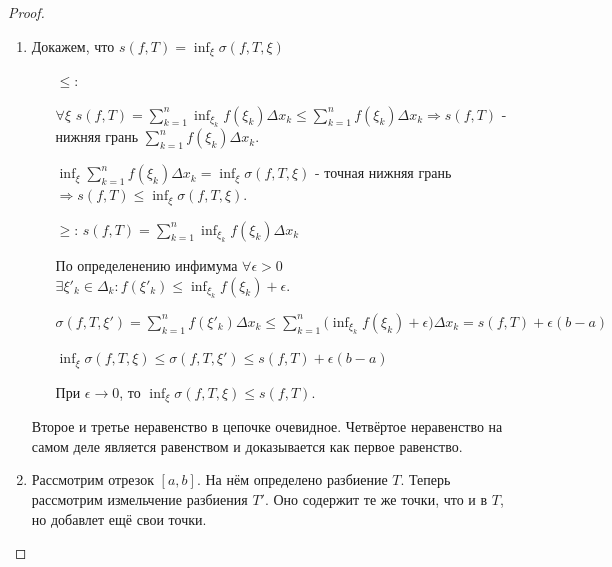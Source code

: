     \begin{proof}
    	\begin{enumerate}
    		\item Докажем, что $\displaystyle s(f, T) = \inf_{\xi}{\sigma(f, T, \xi)}$
    		\begin{enumerate}
    			\item[$\leqslant$:] 
    			
    			$\forall \xi$ $\displaystyle s(f, T) = \sum_{k = 1}^n \inf_{\xi_k}{f(\xi_k) \Delta x_k} \leqslant \sum_{k = 1}^n f(\xi_k) \Delta x_k \Rightarrow s(f, T)$ - нижняя грань $\displaystyle \sum_{k = 1}^n f(\xi_k) \Delta x_k$.
    			
    			$\displaystyle \inf_{\xi}{\sum_{k = 1}^n f(\xi_k) \Delta x_k} = \inf_{\xi}{\sigma(f, T, \xi)}$ - точная нижняя грань $\Rightarrow \displaystyle s(f, T) \leqslant \inf_{\xi}{\sigma(f, T, \xi)}$.
    			
    			\item[$\geqslant$:] $\displaystyle s(f, T) = \sum_{k = 1}^n \inf_{\xi_k}{f(\xi_k) \Delta x_k}$
    			
    			По определенению инфимума $\forall \epsilon > 0$ $\displaystyle \exists \xi'_k \in \Delta_k : f(\xi'_k) \leqslant  \inf_{\xi_k}{f(\xi_k)} + \epsilon.$
    			
    			$\displaystyle \sigma(f, T, \xi') = \sum_{k = 1}^n f(\xi'_k) \Delta x_k \leqslant \sum_{k = 1}^n \bigg(\inf_{\xi_k}{f(\xi_k)} + \epsilon \bigg) \Delta x_k = s(f, T) + \epsilon(b - a)$
    			
    			$\displaystyle \inf_{\xi}{\sigma(f, T, \xi)} \leqslant \sigma(f, T, \xi') \leqslant s(f, T) + \epsilon(b - a)$
    			
    			При $\epsilon \to 0$, то $\displaystyle \inf_{\xi}{\sigma{(f, T, \xi)}} \leqslant s(f, T)$.
    		\end{enumerate}
    		Второе и третье неравенство в цепочке очевидное.
    		Четвёртое неравенство на самом деле является равенством и доказывается как первое равенство.
    		\item Рассмотрим отрезок $[a, b]$. На нём определено разбиение $T$. Теперь рассмотрим измельчение разбиения $T'$. Оно содержит те же точки, что и в $T$, но добавлет ещё свои точки.
    		

\end{enumerate}
\end{proof}
